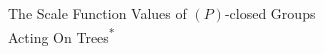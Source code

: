 \documentclass[preview]{standalone}
\begin{document}
\begin{center}
The Scale Function Values of $(P)$-closed Groups \\Acting On Trees\textsuperscript{*}
\end{center}
\end{document}
